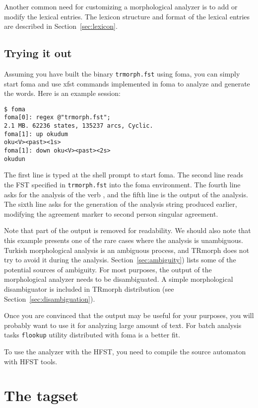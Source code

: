 \documentclass[twocolumn]{article}
\begin{document}
Another common need for customizing a morphological analyzer is to add
or modify the lexical entries. The lexicon structure and format of the
lexical entries are described in Section~\ref{sec:lexicon}.

\subsection{\label{sec:try}Trying it out}

Assuming you have built the binary \lstinline{trmorph.fst} using foma,
you can simply start foma and use xfst commands implemented in foma to
analyze and generate the words. Here is an example session:

\begin{lstlisting}[basicstyle={\color{blue!60!black!90}\small\tt}]
$ foma
foma[0]: regex @"trmorph.fst";
2.1 MB. 62236 states, 135237 arcs, Cyclic.
foma[1]: up okudum
oku<V><past><1s>
foma[1]: down oku<V><past><2s>
okudun
\end{lstlisting}%

The first line is  typed at the shell prompt to start foma.  The
second line reads the FST specified in \lstinline{trmorph.fst} into
the foma environment. The fourth line asks for the analysis of the verb
, and the fifth line is the output of the
analysis. The sixth line asks for the generation of the analysis string
produced earlier, modifying the agreement marker to  second person
singular agreement.

Note that part of the output is removed for readability. We should
also note that this example presents one of the rare cases where the
analysis is unambiguous. Turkish morphological analysis is an
ambiguous process, and TRmorph does not try to avoid it during the
analysis. 
Section~\ref{sec:ambiguity}) lists some of the potential sources of ambiguity. 
For most purposes, the output of the morphological analyzer needs to be disambiguated. 
A simple morphological disambiguator is included in TRmorph distribution (see Section~\ref{sec:disambiguation}).


Once you are convinced that the output may be useful for your purposes, 
you will probably want to use it for analyzing large amount of text. 
For batch analysis tasks \lstinline{flookup} utility distributed with foma is a better fit. 

To use the analyzer with the HFST, you need to compile the source
automaton with HFST tools. 

\section{The tagset}
\end{document}
